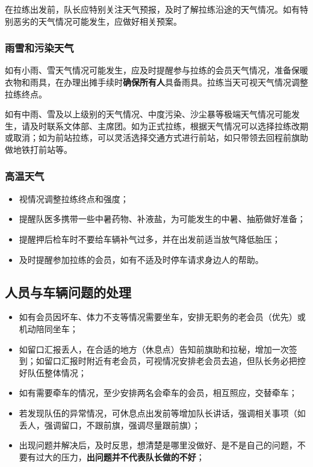 \documentclass[UTF8]{ctexart}
\begin{document}
在拉练出发前，队长应特别关注天气预报，及时了解拉练沿途的天气情况。如有特别恶劣的天气情况可能发生，应做好相关预案。

\subsubsection{雨雪和污染天气}

如有小雨、雪天气情况可能发生，应及时提醒参与拉练的会员天气情况，准备保暖衣物和雨具，在办理出摊手续时\textbf{确保所有人}具备雨具。拉练当天可视天气情况调整拉练终点。

如有中雨、雪及以上级别的天气情况、中度污染、沙尘暴等极端天气情况可能发生，请及时联系文体部、主席团。如为正式拉练，根据天气情况可以选择拉练改期或取消；如为前站拉练，可以灵活选择交通方式进行前站，如只带领去回程前旗助做地铁打前站等。

\subsubsection{高温天气}

\begin{itemize}[nosep,left=2em]
    \item 视情况调整拉练终点和强度；
    \item 提醒队医多携带一些中暑药物、补液盐，为可能发生的中暑、抽筋做好准备；
    \item 提醒押后检车时不要给车辆补气过多，并在出发前适当放气降低胎压；
    \item 及时提醒参加拉练的会员，如有不适及时停车请求身边人的帮助。
\end{itemize}

\subsection{人员与车辆问题的处理}
\begin{itemize}[nosep,left=2em]
    \item 如有会员因坏车、体力不支等情况需要坐车，安排无职务的老会员（优先）或机动陪同坐车；
    \item 如留口汇报丢人，在合适的地方（休息点）告知前旗助和拉秘，增加一次签到；如留口汇报时附近有老会员，可视情况安排老会员去追，但队长务必把控好队伍整体情况；
    \item 如有需要牵车的情况，至少安排两名会牵车的会员，相互照应，交替牵车；
    \item 若发现队伍的异常情况，可休息点出发前等增加队长讲话，强调相关事项（如丢人，强调留口，不跟前旗，强调尽量跟前旗）；
    \item 出现问题并解决后，及时反思，想清楚是哪里没做好、是不是自己的问题，不要有过大的压力，\textbf{出问题并不代表队长做的不好}；
\end{itemize}
\end{document}
